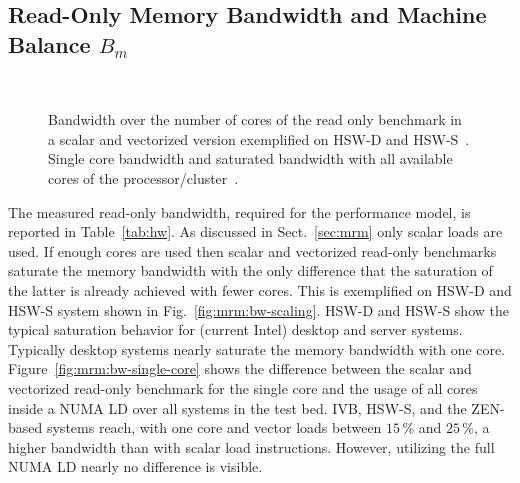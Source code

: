 \subsection{Read-Only Memory Bandwidth and Machine Balance $B_m$}
\label{sec:tb:membw}

\begin{figure}[!t]%
  \centering%
  \captionsetup[subfigure]{farskip=0pt}%
   \, \hspace{0.5cm}
  \caption{Bandwidth over the number of cores of the read only benchmark in a
scalar and vectorized version exemplified on HSW-D and
HSW-S~\protect{}.
Single core bandwidth and saturated bandwidth with all available cores of the
processor/cluster~\protect{}.}
  \label{fig:mrm:bw}
\end{figure}

The measured read-only bandwidth, required for the performance model, is
reported in Table~\ref{tab:hw}.
As discussed in Sect.~\ref{sec:mrm} only scalar loads are used.
%
If enough cores are used then scalar and vectorized read-only benchmarks
saturate the memory bandwidth with the only difference that the saturation of
the latter is already achieved with fewer cores. 
This is exemplified on HSW-D and HSW-S system shown in
Fig.~\ref{fig:mrm:bw-scaling}.
HSW-D and HSW-S show the typical saturation behavior for (current Intel) desktop
and server systems. 
Typically desktop systems nearly saturate the memory bandwidth with one core.
%
Figure~\ref{fig:mrm:bw-single-core} shows the difference between the scalar and
vectorized read-only benchmark for the single core and the usage of all cores
inside a NUMA LD over all systems in the test bed.
IVB, HSW-S, and the ZEN-based
systems reach,
with one core and vector loads between $15$\,\% and
$25$\,\%,
a higher bandwidth
than with scalar load instructions.
However, utilizing the full NUMA LD nearly no difference is visible.
%

